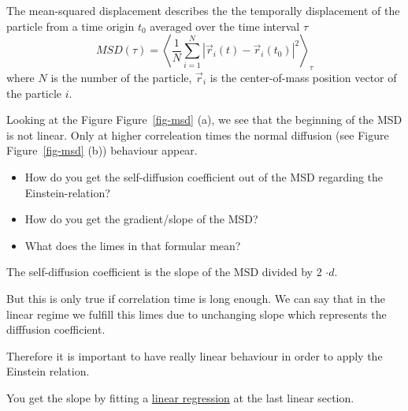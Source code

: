\documentclass[
  letterpaper,
]{article}
\providecommand{\tightlist}{%
  \setlength{\itemsep}{0pt}\setlength{\parskip}{0pt}}\usepackage{longtable,booktabs,array}
\begin{document}
The mean-squared displacement describes the the temporally displacement
of the particle from a time origin \(t_0\) averaged over the time
interval \(\tau\) \[
MSD(\tau) = \left < \frac{1}{N} \sum_{i=1}^{N} |\vec{r} _{i}(t) - \vec{r} _{i}(t_0)|^2  \right >_{\tau}
\] where \(N\) is the number of the particle, \(\vec{r}_{i}\) is the
center-of-mass position vector of the particle \(i\).

Looking at the Figure Figure~\ref{fig-msd} (a), we see that the
beginning of the MSD is not linear. Only at higher correleation times
the normal diffusion (see Figure Figure~\ref{fig-msd} (b)) behaviour
appear.

\begin{tcolorbox}[enhanced jigsaw, opacitybacktitle=0.6, colback=white, rightrule=.15mm, bottomrule=.15mm, coltitle=black, toprule=.15mm, bottomtitle=1mm, arc=.35mm, colframe=quarto-callout-tip-color-frame, opacityback=0, toptitle=1mm, breakable, titlerule=0mm, left=2mm, title=\textcolor{quarto-callout-tip-color}{\faLightbulb}\hspace{0.5em}{Question:}, leftrule=.75mm, colbacktitle=quarto-callout-tip-color!10!white]

\begin{itemize}
\tightlist
\item
  How do you get the self-diffusion coefficient out of the MSD regarding
  the Einstein-relation?
\item
  How do you get the gradient/slope of the MSD?
\item
  What does the limes in that formular mean?
\end{itemize}

\end{tcolorbox}

\begin{tcolorbox}[enhanced jigsaw, opacitybacktitle=0.6, colback=white, rightrule=.15mm, bottomrule=.15mm, coltitle=black, toprule=.15mm, bottomtitle=1mm, arc=.35mm, colframe=quarto-callout-caution-color-frame, opacityback=0, toptitle=1mm, breakable, titlerule=0mm, left=2mm, title=\textcolor{quarto-callout-caution-color}{\faFire}\hspace{0.5em}{Answer:}, leftrule=.75mm, colbacktitle=quarto-callout-caution-color!10!white]

The self-diffusion coefficient is the slope of the MSD divided by 2
\(\cdot d\).

But this is only true if correlation time is long enough. We can say
that in the linear regime we fulfill this limes due to unchanging slope
which represents the difffusion coefficient.

Therefore it is important to have really linear behaviour in order to
apply the Einstein relation.

You get the slope by fitting a
\protect\hyperlink{statistical-excursion}{linear regression} at the last
linear section.

\end{tcolorbox}
\end{document}
